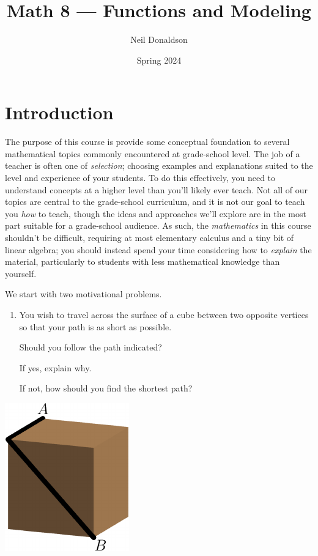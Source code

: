 \graphicspath{{1functions/asy/}}
\thispagestyle{empty}

\title{Math 8 --- Functions and Modeling}
\author{Neil Donaldson}
\date{Spring 2024}
\maketitle	

\section*{Introduction}

The purpose of this course is provide some conceptual foundation to several mathematical topics commonly encountered at grade-school level. The job of a teacher is often one of \emph{selection}; choosing examples and explanations suited to the level and experience of your students. To do this effectively, you need to understand concepts at a higher level than you'll likely ever teach. Not all of our topics are central to the grade-school curriculum, and it is not our goal to teach you \emph{how} to teach, though the ideas and approaches we'll explore are in the most part suitable for a grade-school audience. As such, the \emph{mathematics} in this course shouldn't be difficult, requiring at most elementary calculus and a tiny bit of linear algebra; you should instead spend your time considering how to \emph{explain} the material, particularly to students with less mathematical knowledge than yourself.\par

\begin{minipage}[t]{0.72\linewidth}\vspace{0pt}
We start with two motivational problems.\footnotemark
\begin{enumerate}
  \item You wish to travel across the surface of a cube between two opposite vertices so that your path is as short as possible.\par
  Should you follow the path indicated?\par
  If yes, explain why.\par
  If not, how should you find the shortest path?
\end{enumerate}
\end{minipage}\hfill\begin{minipage}[t]{0.25\linewidth}\vspace{-10pt}
\flushright\includegraphics{intro-cube_0}
\end{minipage}\smallbreak

